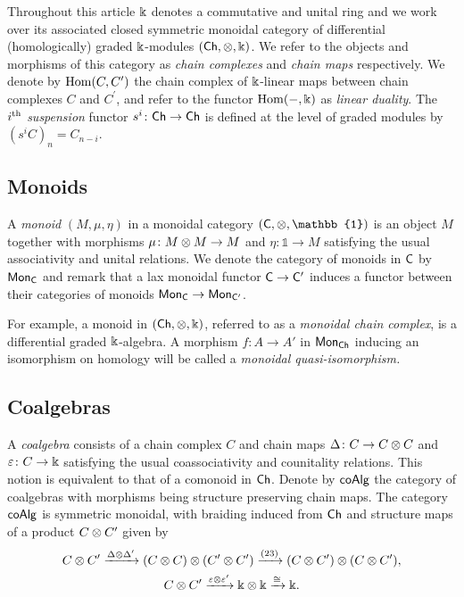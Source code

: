 Throughout this article $\Bbbk$ denotes a commutative and unital ring and we work over its associated closed symmetric monoidal category of differential (homologically) graded $\Bbbk$-modules $(\mathsf{Ch}, \otimes, \Bbbk)$.
We refer to the objects and morphisms of this category as \textit{chain complexes} and \textit{chain maps} respectively.
We denote by $\mathrm{Hom}(C, C^\prime)$ the chain complex of $\Bbbk$-linear maps between chain complexes $C$ and $C^\prime$, and refer to the functor $\mathrm{Hom}(-, \Bbbk)$ as \textit{linear duality}.
The $i^{\mathrm{th}}$ \textit{suspension} functor $s^i \colon \mathsf{Ch} \to \mathsf{Ch}$ is defined at the level of graded modules by $(s^{i}C)_n = C_{n-i}$.

\subsection{Monoids}

A \textit{monoid} $(M, \mu, \eta)$ in a monoidal category $(\sC, \ot, \mathbb{1})$ is an object $M$ together with morphisms $\mu \colon M \otimes M \to M$ and $\eta \colon \mathbb{1} \to M$ satisfying the usual associativity and unital relations.
We denote the category of monoids in $\mathsf{C}$ by $\mathsf{Mon}_{\mathsf{C}}$ and remark that a lax monoidal functor $\mathsf{C} \to \mathsf{C}^\prime$ induces a functor between their categories of monoids $\mathsf{Mon}_{\mathsf{C}} \to \mathsf{Mon}_{\mathsf{C}^\prime}$.

For example, a monoid in $(\mathsf{Ch}, \otimes, \Bbbk)$, referred to as a \textit{monoidal chain complex}, is a differential graded $\Bbbk$-algebra.
A morphism $f: A \to A'$ in $\mathsf{Mon}_{\mathsf{Ch}}$ inducing an isomorphism on homology will be called a \textit{monoidal quasi-isomorphism.}

\subsection{Coalgebras}\label{ss:coalgebras}

A \textit{coalgebra} consists of a chain complex $C$ and chain maps $\Delta \colon C \to C \otimes C$ and $\varepsilon \colon C \to \Bbbk$ satisfying the usual coassociativity and counitality relations.
This notion is equivalent to that of a comonoid in $\mathsf{Ch}$.
Denote by $\mathsf{coAlg}$ the category of coalgebras with morphisms being structure preserving chain maps.
The category $\mathsf{coAlg}$ is symmetric monoidal, with braiding induced from $\mathsf{Ch}$ and structure maps of a product $C \otimes C^\prime$ given by
\begin{gather*}
	C \otimes C^\prime \xrightarrow{\Delta \otimes \Delta^\prime}
	(C \otimes C) \otimes (C^\prime \otimes C^\prime) \xrightarrow{(23)}
	(C \otimes C^\prime) \otimes (C \otimes C^\prime), \\
	C \otimes C^\prime \xrightarrow{\varepsilon \otimes \varepsilon^\prime}
	\Bbbk \otimes \Bbbk \xrightarrow{\cong} \Bbbk.
\end{gather*}

